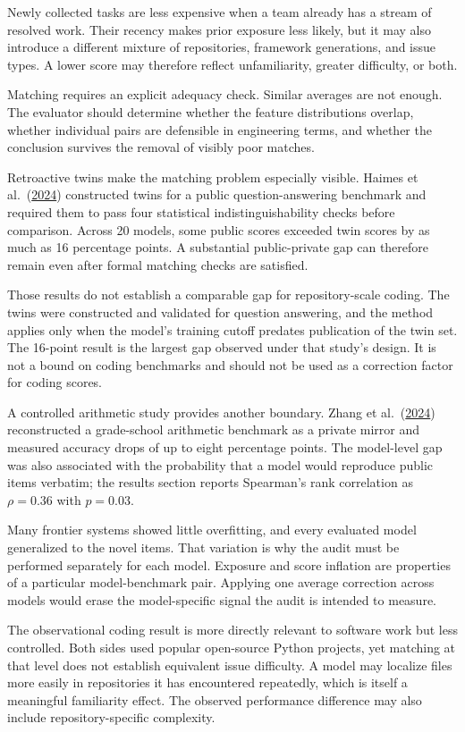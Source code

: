 Newly collected tasks are less expensive when a team already has a stream of resolved work. Their recency makes prior exposure less likely, but it may also introduce a different mixture of repositories, framework generations, and issue types. A lower score may therefore reflect unfamiliarity, greater difficulty, or both.

Matching requires an explicit adequacy check. Similar averages are not enough. The evaluator should determine whether the feature distributions overlap, whether individual pairs are defensible in engineering terms, and whether the conclusion survives the removal of visibly poor matches.

Retroactive twins make the matching problem especially visible. Haimes et al.~(\href{https://arxiv.org/abs/2410.09247}{2024}) constructed twins for a public question-answering benchmark and required them to pass four statistical indistinguishability checks before comparison. Across 20 models, some public scores exceeded twin scores by as much as 16 percentage points. A substantial public-private gap can therefore remain even after formal matching checks are satisfied.

Those results do not establish a comparable gap for repository-scale coding. The twins were constructed and validated for question answering, and the method applies only when the model's training cutoff predates publication of the twin set. The 16-point result is the largest gap observed under that study's design. It is not a bound on coding benchmarks and should not be used as a correction factor for coding scores.

A controlled arithmetic study provides another boundary. Zhang et al.~(\href{https://arxiv.org/abs/2405.00332}{2024}) reconstructed a grade-school arithmetic benchmark as a private mirror and measured accuracy drops of up to eight percentage points. The model-level gap was also associated with the probability that a model would reproduce public items verbatim; the results section reports Spearman's rank correlation as \(\rho=0.36\) with \(p=0.03\).

Many frontier systems showed little overfitting, and every evaluated model generalized to the novel items. That variation is why the audit must be performed separately for each model. Exposure and score inflation are properties of a particular model-benchmark pair. Applying one average correction across models would erase the model-specific signal the audit is intended to measure.

The observational coding result is more directly relevant to software work but less controlled. Both sides used popular open-source Python projects, yet matching at that level does not establish equivalent issue difficulty. A model may localize files more easily in repositories it has encountered repeatedly, which is itself a meaningful familiarity effect. The observed performance difference may also include repository-specific complexity.

